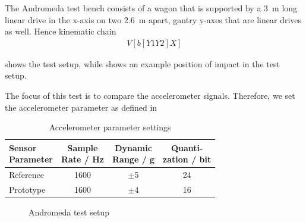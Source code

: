 The Andromeda test bench consists of a wagon that is supported by a \SI{3}{\meter} long linear drive in the x-axis on two \SI{2.6}{\meter} apart, gantry y-axes that are linear drives as well. Hence kinematic chain
\begin{align*}
    V[b [Y1 Y2] X]
\end{align*}

 shows the test setup, while  shows an example position of impact in the test setup.

The focus of this test is to compare the accelerometer signals. Therefore, we set the accelerometer parameter as defined in 

\begin{table}[!htb]
    \centering
    \def\coltitle#1{\multicolumn{1}{c}{#1}}
    {\renewcommand{\arraystretch}{1.5}%
    \footnotesize
		\begin{tabular}{lccc}
            \toprule
            \makecell{Sensor\\Parameter} &
            \makecell{Sample\\Rate / \si{Hz}} &
            \makecell{Dynamic\\Range / \si{g}} & \makecell{Quanti-\\zation / \si{bit}}\\
            \midrule
            Reference & 1600 & $\pm$5 & 24\\
            Prototype & 1600 & $\pm$4 & 16\\
            \bottomrule
		\end{tabular}
    \normalsize
    }
    \caption[Set Accelerometer Parameters]{Accelerometer parameter settings}
    \label{tab:set_acc_par}
\end{table}

\begin{figure}[!htb]
    \centering
        \hspace{4em}
    \caption[Andromeda Test Setup]{Andromeda test setup}
    \label{fig:andromeda_pics}
\end{figure}

